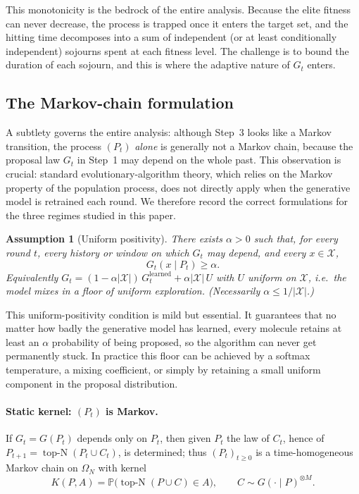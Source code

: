 \documentclass[11pt,a4paper]{article}
\newtheorem{assumption}{Assumption}   %
\newcommand{\X}{\mathcal{X}}
\newcommand{\Omn}{\Omega_N}
\newcommand{\Prob}{\mathbb{P}}
\DeclareMathOperator{\topN}{top\text{-}N}
\begin{document}
This monotonicity is the bedrock of the entire analysis.  Because the
elite fitness can never decrease, the process is trapped once it enters
the target set, and the hitting time decomposes into a sum of independent
(or at least conditionally independent) sojourns spent at each fitness
level.  The challenge is to bound the duration of each sojourn, and this
is where the adaptive nature of $G_t$ enters.

\subsection{The Markov-chain formulation}
\label{sec:markov}

A subtlety governs the entire analysis: although Step~3 looks like a
Markov transition, the process $(P_t)$ \emph{alone} is generally not a
Markov chain, because the proposal law $G_t$ in Step~1 may depend on the
whole past.  This observation is crucial: standard evolutionary-algorithm
theory, which relies on the Markov property of the population process,
does not directly apply when the generative model is retrained each round.
We therefore record the correct formulations for the three regimes
studied in this paper.

\begin{assumption}[Uniform positivity]\label{ass:positivity}
  There exists $\alpha>0$ such that, for every round $t$, every history
  or window on which $G_t$ may depend, and every $x\in\X$,
  \[
    G_t(x\mid P_t)\ge\alpha.
  \]
  Equivalently $G_t=(1-\alpha|\X|)\,G_t^{\mathrm{learned}}+\alpha|\X|\,U$
  with $U$ uniform on $\X$, i.e.\ the model mixes in a floor of uniform
  exploration.  (Necessarily $\alpha\le1/|\X|$.)
\end{assumption}

This uniform-positivity condition is mild but essential.  It guarantees
that no matter how badly the generative model has learned, every molecule
retains at least an $\alpha$ probability of being proposed, so the
algorithm can never get permanently stuck.  In practice this floor can be
achieved by a softmax temperature, a mixing coefficient, or simply by
retaining a small uniform component in the proposal distribution.

\paragraph{Static kernel: $(P_t)$ is Markov.}
If $G_t=G(P_t)$ depends only on $P_t$, then given $P_t$ the law of
$C_t$, hence of $P_{t+1}=\topN(P_t\cup C_t)$, is determined; thus
$(P_t)_{t\ge0}$ is a time-homogeneous Markov chain on $\Omn$ with kernel
\[
  K(P,A)=\Prob\bigl(\topN(P\cup C)\in A\bigr),
  \qquad C\sim G(\cdot\mid P)^{\otimes M}.
\]
\end{document}
